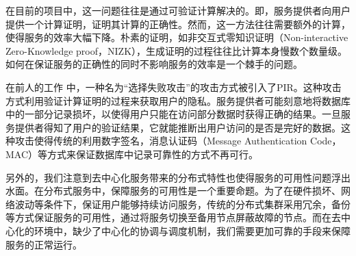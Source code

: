 在目前的项目中，这一问题往往是通过可验证计算解决的。即，服务提供者向用户提供一个计算证明，证明其计算的正确性。然而，这一方法往往需要额外的计算，使得服务的效率大幅下降。朴素的证明，如非交互式零知识证明（Non-interactive Zero-Knowledge proof，NIZK），生成证明的过程往往比计算本身慢数个数量级。如何在保证服务的正确性的同时不影响服务的效率是一个棘手的问题。

在前人的工作 \cite{APIR} 中，一种名为“选择失败攻击”的攻击方式被引入了PIR。这种攻击方式利用验证计算证明的过程来获取用户的隐私。服务提供者可能刻意地将数据库中的一部分记录损坏，以使得用户只能在访问部分数据时获得正确的结果。一旦服务提供者得知了用户的验证结果，它就能推断出用户访问的是否是完好的数据。这种攻击使得传统的利用数字签名，消息认证码（Message Authentication Code，MAC）等方式来保证数据库中记录可靠性的方式不再可行。

另外的，我们注意到去中心化服务带来的分布式特性也使得服务的可用性问题浮出水面。在分布式服务中，保障服务的可用性是一个重要命题。为了在硬件损坏、网络波动等条件下，保证用户能够持续访问服务，传统的分布式集群采用冗余，备份等方式保证服务的可用性，通过将服务切换至备用节点屏蔽故障的节点。而在去中心化的环境中，缺少了中心化的协调与调度机制，我们需要更加可靠的手段来保障服务的正常运行。

